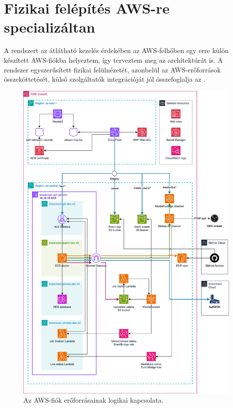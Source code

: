 \section{Fizikai felépítés AWS-re specializáltan}

A rendszert az átlátható kezelés érdekében az AWS-felhőben egy erre külön készített AWS-fiókba helyeztem, így terveztem meg az architektúrát is. A rendszer egyszerűsített fizikai felülnézetét, azonbelül az AWS-erőforrások összeköttetését, külső szolgáltatók integrációját jól összefoglalja az .

\begin{figure}
	\centering
	\includegraphics[width=160mm, keepaspectratio]{figures/dipterv_archbig.png}
	\caption{Az AWS-fiók erőforrásainak logikai kapcsolata.}
	\label{fig:architect}
\end{figure}

